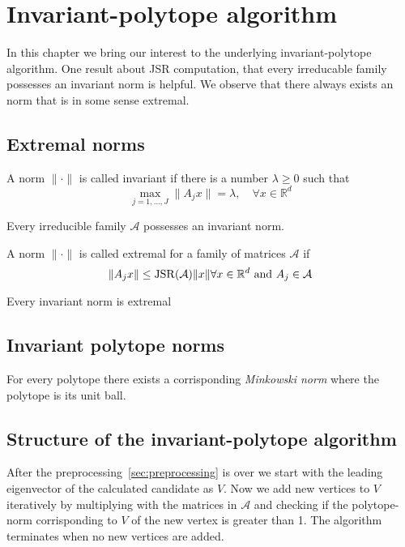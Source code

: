 
\chapter{Invariant-polytope algorithm}
\label{ch:inv.poly}	

In this chapter we bring our interest to the underlying invariant-polytope algorithm. 
One result about JSR computation, that every irreducable family possesses an invariant norm is helpful. We observe that there always exists an norm that is in some sense extremal. 

\section{Extremal norms}
\label{sec:extremal-norms}

\begin{definition}
    A norm $\lVert \cdot \rVert$ is called invariant if there is a number $\lambda \geq 0$ such that 
    $$\max\limits_{j=1,...,J}\lVert A_j x \rVert = \lambda, \quad \forall x \in \mathbb{R}^d$$
\end{definition}

\begin{theorem}
    Every irreducible family $\mathcal{A}$ possesses an invariant norm.
\end{theorem}

\begin{definition}
    A norm $\lVert \cdot \rVert$ is called extremal for a family of matrices $\mathcal{A}$ if 
    $$\lVert A_j x \rVert \leq \operatorname{JSR}(\mathcal{A}) \lVert x \rVert \forall x \in \mathbb{R}^d \text{ and } A_j \in \mathcal{A}$$
\end{definition}

Every invariant norm is extremal

\section{Invariant polytope norms}
For every polytope there exists a corrisponding \emph{Minkowski norm} where the polytope is its unit ball.

\section{Structure of the invariant-polytope algorithm}
After the preprocessing~\ref{sec:preprocessing} is over we start with the leading eigenvector of the calculated candidate as $V$. 
Now we add new vertices to $V$ iteratively by multiplying with the matrices in $\mathcal{A}$ and checking if the polytope-norm corrisponding to $V$ of the new vertex is greater than 1.
The algorithm terminates when no new vertices are added.

